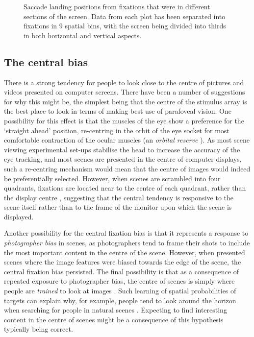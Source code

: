 \begin{figure}[htb]
\caption{Saccade landing positions from fixations that were in different sections of the screen. Data from each plot has been separated into fixations in 9 spatial bins, with the screen being divided into thirds in both horizontal and vertical aspects.}
\label{fig:empiricalSaccadicFlow}
\end{figure}

\subsection{The central bias}
 
There is a strong tendency for people to look close to the centre of pictures \citep{tatler2007, tatler2005, canosa2003, clarke-tatler2014} and videos \citep{tseng2009,loschky2015} presented on computer screens. There have been a number of suggestions for why this might be, the simplest being that the centre of the stimulus array is the best place to look in terms of making best use of parafoveal vision. One possibility for this effect is that the muscles of the eye show a preference for the `straight ahead' position, re-centring in the orbit of the eye socket for most comfortable contraction of the ocular muscles (an \emph{orbital reserve} \citep{fuller1996}). As most scene viewing experimental set-ups stabilise the head to increase the accuracy of the eye tracking, and most scenes are presented in the centre of computer displays, such a re-centring mechanism would mean that the centre of images would indeed be preferentially selected. However, when scenes are scrambled into four quadrants, fixations are located near to the centre of each quadrant, rather than the display centre \citep{stainer2013}, suggesting that the central tendency is responsive to the scene itself rather than to the frame of the monitor upon which the scene is displayed. 

Another possibility for the central fixation bias is that it represents a response to \emph{photographer bias} in scenes, as photographers tend to frame their shots to include the most important content in the centre of the scene. However, when \cite{tatler2007} presented scenes where the image features were biased towards the edge of the scene, the central fixation bias persisted. The final possibility is that as a consequence of repeated exposure to photographer bias, the centre of scenes is simply where people are \emph{trained} to look at images \citep{parkhurst2002}. Such learning of spatial probabilities of targets can explain why, for example, people tend to look around the horizon when searching for people in natural scenes \citep{birmingham2009, torralba2006, ehinger2009}. Expecting to find interesting content in the centre of scenes might be a consequence of this hypothesis typically being correct. 

